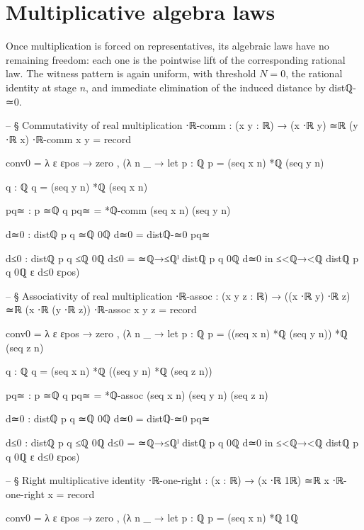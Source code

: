 \documentclass[11pt,a4paper]{book}
\def\texttt#1{#1}%
\begin{document}
\section{Multiplicative algebra laws}

Once multiplication is forced on representatives, its algebraic laws have no remaining freedom: each one is the pointwise lift of the corresponding rational law. The witness pattern is again uniform, with threshold $N = 0$, the rational identity at stage $n$, and immediate elimination of the induced distance by \texttt{distℚ-≃0}.

\begin{code}
-- § Commutativity of real multiplication
⋅ℝ-comm : (x y : ℝ) → (x ⋅ℝ y) ≃ℝ (y ⋅ℝ x)
⋅ℝ-comm x y = record
  { conv0 = λ ε εpos →
      zero , (λ n _ →
        let
          p : ℚ
          p = (seq x n) *ℚ (seq y n)

          q : ℚ
          q = (seq y n) *ℚ (seq x n)

          pq≃ : p ≃ℚ q
          pq≃ = *ℚ-comm (seq x n) (seq y n)

          d≃0 : distℚ p q ≃ℚ 0ℚ
          d≃0 = distℚ-≃0 pq≃

          d≤0 : distℚ p q ≤ℚ 0ℚ
          d≤0 = ≃ℚ→≤ℚˡ {distℚ p q} {0ℚ} d≃0
        in
        ≤<ℚ→<ℚ {distℚ p q} {0ℚ} {ε} d≤0 εpos)
  }

-- § Associativity of real multiplication
⋅ℝ-assoc : (x y z : ℝ) → ((x ⋅ℝ y) ⋅ℝ z) ≃ℝ (x ⋅ℝ (y ⋅ℝ z))
⋅ℝ-assoc x y z = record
  { conv0 = λ ε εpos →
      zero , (λ n _ →
        let
          p : ℚ
          p = ((seq x n) *ℚ (seq y n)) *ℚ (seq z n)

          q : ℚ
          q = (seq x n) *ℚ ((seq y n) *ℚ (seq z n))

          pq≃ : p ≃ℚ q
          pq≃ = *ℚ-assoc (seq x n) (seq y n) (seq z n)

          d≃0 : distℚ p q ≃ℚ 0ℚ
          d≃0 = distℚ-≃0 pq≃

          d≤0 : distℚ p q ≤ℚ 0ℚ
          d≤0 = ≃ℚ→≤ℚˡ {distℚ p q} {0ℚ} d≃0
        in
        ≤<ℚ→<ℚ {distℚ p q} {0ℚ} {ε} d≤0 εpos)
  }

-- § Right multiplicative identity
⋅ℝ-one-right : (x : ℝ) → (x ⋅ℝ 1ℝ) ≃ℝ x
⋅ℝ-one-right x = record
  { conv0 = λ ε εpos →
      zero , (λ n _ →
        let
          p : ℚ
          p = (seq x n) *ℚ 1ℚ

}
\end{code}
\end{document}
